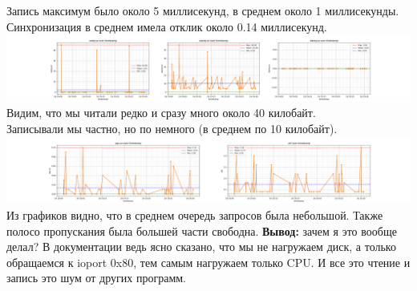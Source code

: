 Запись максимум было около 5 миллисекунд, в среднем около 1 миллисекунды.  \\
Синхронизация в среднем имела отклик около 0.14 миллисекунд.
\includegraphics[width=\textwidth]{./io/image/iostat_6.png}
Видим, что мы читали редко и сразу много около 40 килобайт.\\
Записывали мы частно, но по немного (в среднем по 10 килобайт).\\
\includegraphics[width=\textwidth]{./io/image/iostat_7.png}
Из графиков видно, что в среднем очередь запросов была небольшой. Также полосо пропускания была большей части свободна.
\textbf{Вывод:} зачем я это  вообще делал? В документации ведь ясно сказано, что мы не нагружаем диск, а только обращаемся к ioport 0x80, тем самым нагружаем только CPU.
И все это чтение и запись это шум от других программ.
